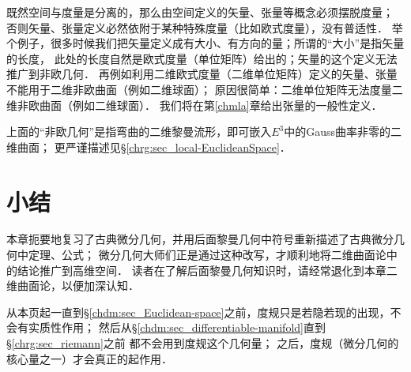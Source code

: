 既然空间与度量是分离的，那么由空间定义的矢量、张量等概念必须摆脱度量；
否则矢量、张量定义必然依附于某种特殊度量（比如欧式度量），没有普适性．
举个例子，很多时候我们把矢量定义成有大小、有方向的量；所谓的“大小”是指矢量的长度，
此处的长度自然是欧式度量（单位矩阵）给出的；矢量的这个定义无法推广到非欧几何．
再例如利用二维欧式度量（二维单位矩阵）定义的矢量、张量不能用于二维非欧曲面（例如二维球面）；
原因很简单：二维单位矩阵无法度量二维非欧曲面（例如二维球面）．
我们将在第\ref{chmla}章给出张量的一般性定义．

\begin{remark}
	上面的“非欧几何”是指弯曲的二维黎曼流形，即可嵌入$E^3$中的Gauss曲率非零的二维曲面；
	更严谨描述见\S\ref{chrg:sec_local-EuclideanSpace}．
\end{remark}


\section*{小结}
本章扼要地复习了古典微分几何，并用后面黎曼几何中符号重新描述了古典微分几何中定理、公式；
微分几何大师们正是通过这种改写，才顺利地将二维曲面论中的结论推广到高维空间．
读者在了解后面黎曼几何知识时，请经常退化到本章二维曲面论，以便加深认知．


从本页起一直到\S\ref{chdm:sec_Euclidean-space}之前，度规只是若隐若现的出现，不会有实质性作用；
然后从\S\ref{chdm:sec_differentiable-manifold}直到\S\ref{chrg:sec_riemann}之前
都不会用到度规这个几何量；
之后，度规（微分几何的核心量之一）才会真正的起作用．


\printbibliography[heading=subbibliography,title=第\ref{chcdg}章参考文献]


\endinput
